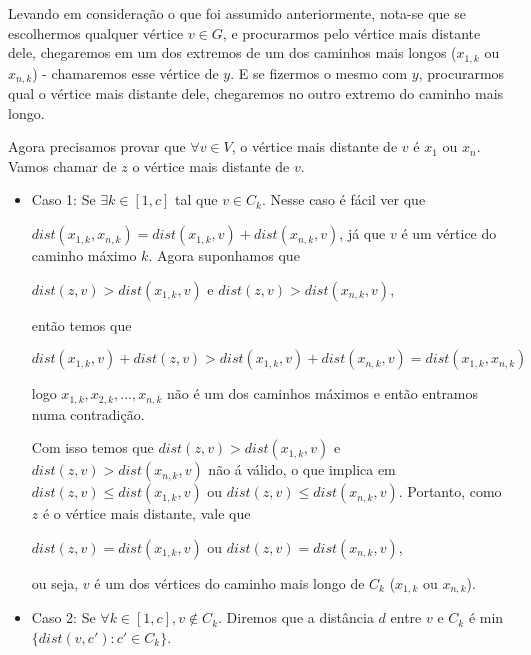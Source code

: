 \documentclass[a4paper,12pt]{article}
\begin{document}
        Levando em consideração o que foi assumido anteriormente,
        nota-se que se escolhermos 
        qualquer vértice $v \in G$, e procurarmos pelo vértice mais
        distante dele, chegaremos em um dos extremos de um dos 
        caminhos mais longos ($x_{1, k}$ 
        ou $x_{n, k}$) - chamaremos esse vértice de $y$.
        E se fizermos o mesmo com $y$, procurarmos qual o vértice 
        mais distante dele, chegaremos no
        outro extremo do caminho mais longo.
        

        Agora precisamos provar que $\forall v \in V$, o vértice 
        mais distante
        de $v$ é $x_1$ ou $x_n$.
        Vamos chamar de $z$ o vértice mais distante de $v$.
        

        \begin{itemize}
            \item Caso 1: Se $\exists k \in [1, c]$ tal que 
            $v \in C_k$.
            Nesse caso é fácil ver que 

            $dist(x_{1, k}, x_{n, k})=
            dist(x_{1, k}, v)+dist(x_{n, k}, v)$, 
            já que $v$ é um vértice do caminho máximo $k$.
            Agora suponhamos que 

            $dist(z, v)>dist(x_{1, k}, v)$ e 
            $dist(z, v)>dist(x_{n, k}, v)$,
            
            então temos que 
            
            $dist(x_{1, k}, v)+dist(z, v)>
            dist(x_{1, k}, v)+dist(x_{n, k}, v)=
            dist(x_{1, k}, x_{n, k})$
            
            logo $x_{1, k}, x_{2, k},..., x_{n, k}$ não é um dos 
            caminhos máximos e então entramos numa contradição.

            Com isso temos que 
            $dist(z, v)>dist(x_{1, k}, v)$ e 
            $dist(z, v)>dist(x_{n, k}, v)$ não á válido, o que 
            implica em $dist(z, v)\le dist(x_{1, k}, v)$ ou 
            $dist(z, v)\le dist(x_{n, k}, v)$. 
            Portanto, como $z$ é o vértice mais distante, vale que
            
            $dist(z, v)=dist(x_{1, k}, v)$ ou 
            $dist(z, v)=dist(x_{n, k}, v)$,
            
            ou seja, $v$ é um dos vértices do caminho mais longo
            de $C_k$ ($x_{1, k}$ ou $x_{n, k}$).

            \item Caso 2: Se $\forall k \in [1, c], v \notin C_k$. 
            Diremos que a distância $d$ entre $v$ e $C_k$ é 
            min$\{dist(v, c'): c'\in C_k\}$.


\end{itemize}
\end{document}
